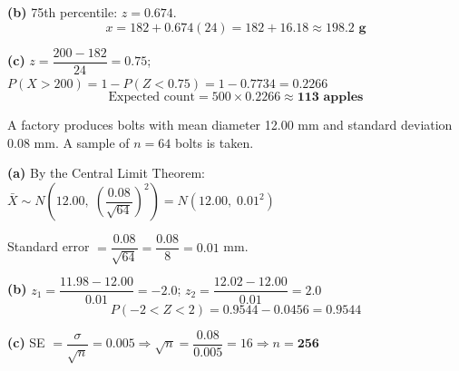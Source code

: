 \documentclass[addpoints]{exam}
\begin{document}
\begin{questions}
\begin{solution}[9cm]
\textbf{(b)} 75th percentile: $z = 0.674$.
\[
x = 182 + 0.674(24) = 182 + 16.18 \approx \mathbf{198.2 \text{ g}}
\]

\textbf{(c)} $z = \dfrac{200-182}{24} = 0.75$;\quad $P(X>200) = 1 - P(Z<0.75) = 1 - 0.7734 = 0.2266$
\[
\text{Expected count} = 500 \times 0.2266 \approx \mathbf{113 \text{ apples}}
\]
\end{solution}

\question A factory produces bolts with mean diameter 12.00 mm and standard deviation
0.08 mm. A sample of $n = 64$ bolts is taken.
\begin{solution}[9cm]
\textbf{(a)} By the Central Limit Theorem:
$\bar{X} \sim N\!\left(12.00,\;\left(\dfrac{0.08}{\sqrt{64}}\right)^2\right)
= N(12.00,\; 0.01^2)$

Standard error $= \dfrac{0.08}{\sqrt{64}} = \dfrac{0.08}{8} = \mathbf{0.01}$ mm.

\textbf{(b)} $z_1 = \dfrac{11.98 - 12.00}{0.01} = -2.0$;\quad
$z_2 = \dfrac{12.02 - 12.00}{0.01} = 2.0$
\[
P(-2 < Z < 2) = 0.9544 - 0.0456 = \mathbf{0.9544}
\]

\textbf{(c)} SE $= \dfrac{\sigma}{\sqrt{n}} = 0.005 \Rightarrow \sqrt{n} = \dfrac{0.08}{0.005} = 16
\Rightarrow n = \mathbf{256}$
\end{solution}

\end{questions}
\end{document}
